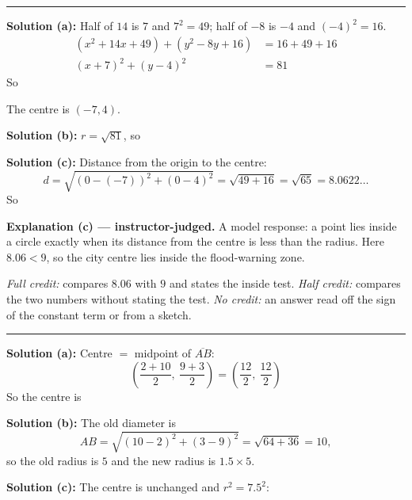 \documentclass[12pt]{article}
\begin{document}
\vspace{0.2cm}\noindent\rule{\linewidth}{0.2pt}


\textbf{Solution (a):} Half of $14$ is $7$ and $7^2 = 49$; half of $-8$ is $-4$ and $(-4)^2 = 16$.
\begin{align*}
  (x^2 + 14x + 49) + (y^2 - 8y + 16) &= 16 + 49 + 16 \\
  (x + 7)^2 + (y - 4)^2 &= 81
\end{align*}
So 

The centre is $(-7, 4)$.

\textbf{Solution (b):} $r = \sqrt{81}$, so 

\textbf{Solution (c):} Distance from the origin to the centre:
\[ d = \sqrt{(0-(-7))^2 + (0-4)^2} = \sqrt{49 + 16} = \sqrt{65} = 8.0622\ldots \]
So 

\textbf{Explanation (c) --- instructor-judged.} A model response: a point lies inside a circle exactly when its distance from the centre is less than the radius. Here $8.06 < 9$, so the city centre lies inside the flood-warning zone.

\emph{Full credit:} compares $8.06$ with $9$ and states the inside test. \emph{Half credit:} compares the two numbers without stating the test. \emph{No credit:} an answer read off the sign of the constant term or from a sketch.

\vspace{0.2cm}\noindent\rule{\linewidth}{0.2pt}


\textbf{Solution (a):} Centre $=$ midpoint of $\overline{AB}$:
\[ \left( \frac{2 + 10}{2}, \ \frac{9 + 3}{2} \right) = \left( \frac{12}{2}, \ \frac{12}{2} \right) \]
So the centre is 

\textbf{Solution (b):} The old diameter is
\[ AB = \sqrt{(10-2)^2 + (3-9)^2} = \sqrt{64 + 36} = 10, \]
so the old radius is $5$ and the new radius is $1.5 \times 5$. 

\textbf{Solution (c):} The centre is unchanged and $r^2 = 7.5^2$: 
\end{document}
